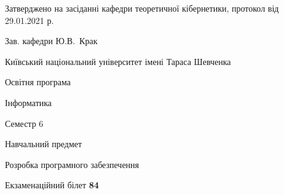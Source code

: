 \documentclass[10pt, ukrainian]{article}
\begin{document}
{\vspace{5mm}\smallskip \begin {small} Затверджено на засіданні кафедри теоретичної кібернетики, протокол  від   29.01.2021 р.\par\smallskip\smallskip
{\parbox {6.5 cm}{Зав. кафедри \dotfill Ю.В.~Крак}} \end{small}}
\newpage

{{\begin {small}\par
{ \center  Київський національний університет імені Тараса Шевченка \par}
{\parbox {5 cm}{Освітня програма \hfill}{\parbox {7 cm}{Інформатика \hfill}}\parbox {6 cm}{\hfill Семестр 6}}\par
{\parbox {5 cm} {Навчальний предмет \hfill}\parbox {7 cm}{Розробка програмного забезпечення \hfill}\parbox {6cm}{\hfill}\par}\vspace{-7pt} \end{small}}{\center Екзаменаційний білет \No \textbf
{ 84 }\par}}
\end{document}
